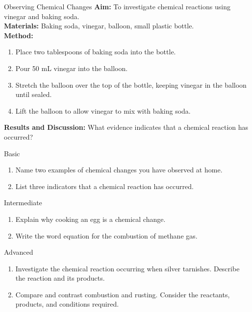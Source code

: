 \begin{investigation}{Observing Chemical Changes}
\textbf{Aim:} To investigate chemical reactions using vinegar and baking soda.\\[5pt]
\textbf{Materials:} Baking soda, vinegar, balloon, small plastic bottle.\\[5pt]
\textbf{Method:}
\begin{enumerate}
\item Place two tablespoons of baking soda into the bottle.
\item Pour 50 mL vinegar into the balloon.
\item Stretch the balloon over the top of the bottle, keeping vinegar in the balloon until sealed.
\item Lift the balloon to allow vinegar to mix with baking soda.
\end{enumerate}
\textbf{Results and Discussion:} What evidence indicates that a chemical reaction has occurred?
\end{investigation}

\begin{tieredquestions}{Basic}
\begin{enumerate}
\item Name two examples of chemical changes you have observed at home.
\item List three indicators that a chemical reaction has occurred.
\end{enumerate}
\end{tieredquestions}

\begin{tieredquestions}{Intermediate}
\begin{enumerate}
\item Explain why cooking an egg is a chemical change.
\item Write the word equation for the combustion of methane gas.
\end{enumerate}
\end{tieredquestions}

\begin{tieredquestions}{Advanced}
\begin{enumerate}
\item Investigate the chemical reaction occurring when silver tarnishes. Describe the reaction and its products.
\item Compare and contrast combustion and rusting. Consider the reactants, products, and conditions required.
\end{enumerate}
\end{tieredquestions}

